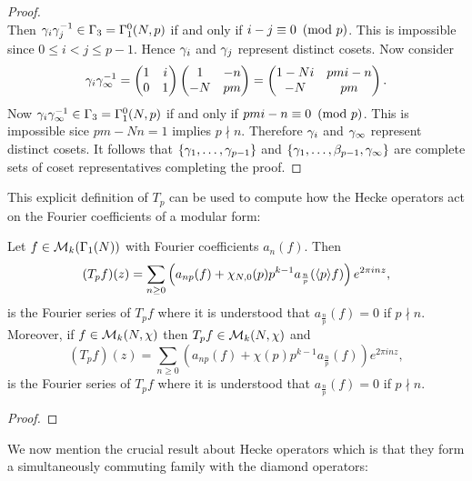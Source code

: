 \begin{proof}
\[        \]
        Then $\gamma_{i}\gamma_{j}^{-1} \in 
        \Gamma_{3} = \Gamma_{1}^{0}(N,p)$ if and only if $i-j \equiv 0 \ \left(\text{mod }p\right)$. This is impossible since $0 \le i < j \le p-1$. Hence $\gamma_{i}$ and $\gamma_{j}$ represent distinct cosets. Now consider
        \[
          \gamma_{i}\gamma_{\infty}^{-1} = \begin{pmatrix} 1 & i \\ 0 & 1 \end{pmatrix}\begin{pmatrix} 1 & -n \\ -N & pm \end{pmatrix} = \begin{pmatrix} 1-Ni & pmi-n \\ -N & pm \end{pmatrix}.
        \]
        Now $\gamma_{i}\gamma_{\infty}^{-1} \in  \Gamma_{3} = \Gamma_{1}^{0}(N,p)$ if and only if $pmi-n \equiv 0 \ \left(\text{mod }p\right)$. This is impossible sice $pm-Nn = 1$ implies $p \nmid n$. Therefore $\gamma_{i}$ and $\gamma_{\infty}$ represent distinct cosets. It follows that $\{\gamma_{1},\ldots,\gamma_{p-1}\}$ and $\{\gamma_{1},\ldots,\beta_{p-1},\gamma_{\infty}\}$ are complete sets of coset representatives completing the proof. 
      \end{proof}

      This explicit definition of $T_{p}$ can be used to compute how the Hecke operators act on the Fourier coefficients of a modular form:

      \begin{proposition}\label{prop:prime_Hecke_operators_acting_on_Fourier_coefficients_modular}
        Let $f \in \mathcal{M}_{k}(\Gamma_{1}(N))$ with Fourier coefficients $a_{n}(f)$. Then
        \[
          (T_{p}f)(z) = \sum_{n \ge 0}\left(a_{np}(f)+\chi_{N,0}(p)p^{k-1}a_{\frac{n}{p}}(\langle p\rangle f)\right)e^{2\pi inz},
        \]
        is the Fourier series of $T_{p}f$ where it is understood that $a_{\frac{n}{p}}(f) = 0$ if $p \nmid n$. Moreover, if $f \in \mathcal{M}_{k}(N,\chi)$ then $T_{p}f \in \mathcal{M}_{k}(N,\chi)$ and
        \[
          (T_{p}f)(z) = \sum_{n \ge 0}\left(a_{np}(f)+\chi(p)p^{k-1}a_{\frac{n}{p}}(f)\right)e^{2\pi inz},
        \]
        is the Fourier series of $T_{p}f$ where it is understood that $a_{\frac{n}{p}}(f) = 0$ if $p \nmid n$.
      \end{proposition}
      \begin{proof}
      \end{proof}

      We now mention the crucial result about Hecke operators which is that they form a simultaneously commuting family with the diamond operators:

